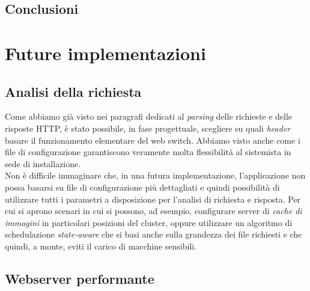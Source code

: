 \documentclass[italian]{tktltiki2}
\begin{document}
\subsection{Conclusioni}
\newpage
\section{Future implementazioni}
\subsection{Analisi della richiesta}
Come abbiamo già visto nei paragrafi dedicati al \emph{parsing} delle richieste e delle risposte HTTP, è stato possibile, in fase progettuale, scegliere su quali \emph{header} basare il funzionamento elementare del web switch. Abbiamo visto anche come i file di configurazione garantiscono veramente molta flessibilità al sistemista in sede di installazione. \\
Non è difficile immaginare che, in una futura implementazione, l'applicazione non possa basarsi su file di configurazione più dettagliati e quindi possibilità di utilizzare tutti i parametri a disposizione per l'analisi di richiesta e risposta. Per cui si aprono scenari in cui si possono, ad esempio, configurare server di \emph{cache di immagini} in particolari posizioni del cluster, oppure utilizzare un algoritmo di schedulazione \emph{state-aware} che si basi anche sulla grandezza dei file richiesti e che quindi, a monte, eviti il carico di macchine sensibili.
\subsection{Webserver performante}


%
%
% 
%
\end{document}
